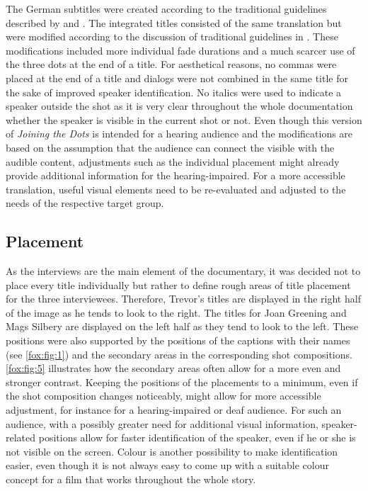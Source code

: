 \documentclass[output=paper]{langsci/langscibook}
\begin{document}
The German subtitles were created according to the traditional guidelines described by \citet{ivarsson1998} and \citet{karamitroglou1998}. The integrated titles consisted of the same translation but were modified according to the discussion of traditional guidelines in \citet{fox2012}. These modifications included more individual fade durations and a much scarcer use of the three dots at the end of a title. For aesthetical reasons, no commas were placed at the end of a title and dialogs were not combined in the same title for the sake of improved speaker identification. No italics were used to indicate a speaker outside the shot as it is very clear throughout the whole documentation whether the speaker is visible in the current shot or not. Even though this version of \textit{Joining the Dots} is intended for a hearing audience and the modifications are based on the assumption that the audience can connect the visible with the audible content, adjustments such as the individual placement might already provide additional information for the hearing-impaired. For a more accessible translation, useful visual elements need to be re-evaluated and adjusted to the needs of the respective target group.


\subsection{Placement}

As the interviews are the main element of the documentary, it was decided not to place every title individually but rather to define rough areas of title placement for the three interviewees. Therefore, Trevor's titles are displayed in the right half of the image as he tends to look to the right. The titles for Joan Greening and Mags Silbery are displayed on the left half as they tend to look to the left. These positions were also supported by the positions of the captions with their names (see \autoref{fox:fig:1}) and the secondary areas in the corresponding shot compositions. \autoref{fox:fig:5} illustrates how the secondary areas often allow for a more even and stronger contrast. Keeping the positions of the placements to a minimum, even if the shot composition changes noticeably, might allow for more accessible adjustment, for instance for a hearing-impaired or deaf audience. For such an audience, with a possibly greater need for additional visual information, speaker-related positions allow for faster identification of the speaker, even if he or she is not visible on the screen. Colour is another possibility to make identification easier, even though it is not always easy to come up with a suitable colour concept for a film that works throughout the whole story.
\end{document}
